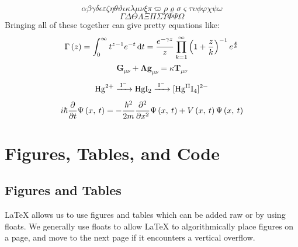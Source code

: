 \documentclass[11pt, twoside]{article}
\begin{document}
\begin{equation*}
    \alpha \beta \gamma \delta \epsilon \varepsilon \zeta \eta \theta \vartheta \iota \kappa \lambda \mu \nu \xi \pi \varpi \rho \varrho \sigma \varsigma \tau \upsilon \phi \varphi \chi \psi \omega
\end{equation*}
\begin{equation*}
    \Gamma \Delta \Theta \Lambda \Xi \Pi \Sigma \Upsilon \Phi \Psi \Omega
\end{equation*}
Bringing all of these together can give pretty equations like:
\begin{equation*}
    \Gamma\left( z \right) = \int_0^\infty t^{z - 1} e^{-t} \odif{t} = \frac{e^{-\gamma z}}{z} \prod_{k = 1}^\infty \left( 1 + \frac{z}{k} \right)^{-1} e^{\frac{z}{k}}
\end{equation*}
\begin{equation*}
    \symbf{G}_{\mu \nu} + \symbf{\Lambda} \symbf{g}_{\mu \nu} = \kappa \symbf{T}_{\mu \nu}
\end{equation*}
\begin{equation*}
    \ce{Hg^2+ ->[I-] HgI2 ->[I-] [Hg^{II}I4]^2-}
\end{equation*}
\begin{equation}
    \label{eq:schrodingers_equation}
    i \hbar \pdv*{\Psi\left( x,\: t \right)}{t} = -\frac{\hbar^2}{2m} \pdv[order=2]{}{x} \Psi\left( x,\: t \right) + V\left( x,\: t \right) \Psi\left( x,\: t \right)
\end{equation}
\newpage
\section{Figures, Tables, and Code}
\subsection{Figures and Tables}\label{sec:figures_and_tables}
\LaTeX{} allows us to use figures and tables which can be added raw or by using floats.
We generally use floats to allow \LaTeX{} to algorithmically place figures on a page, and
move to the next page if it encounters a vertical overflow.
\end{document}
